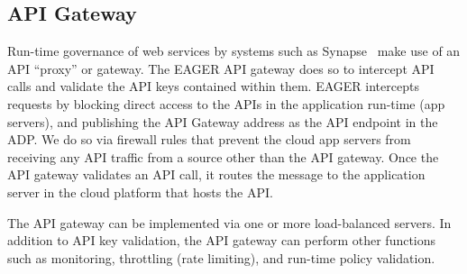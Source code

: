 \subsection{API Gateway} 
Run-time governance of web services by systems such as
Synapse~\cite{synapse} make use of an API ``proxy'' or gateway.
The EAGER API gateway does so to intercept API calls and validate 
the API keys contained within them.
EAGER intercepts requests by blocking direct access to the APIs in the
application run-time (app servers), and publishing the API Gateway address as
the API endpoint in the ADP. We do so via firewall rules
that prevent the cloud app servers from receiving any
API traffic from a source other than the API gateway. Once the API gateway validates
an API call, it routes the message to the
application server in the cloud platform that hosts the API.

The API gateway can be implemented via one or more load-balanced servers.
In addition to API key validation, the API gateway can perform other
functions such as monitoring, throttling (rate limiting), 
and run-time policy validation. 
